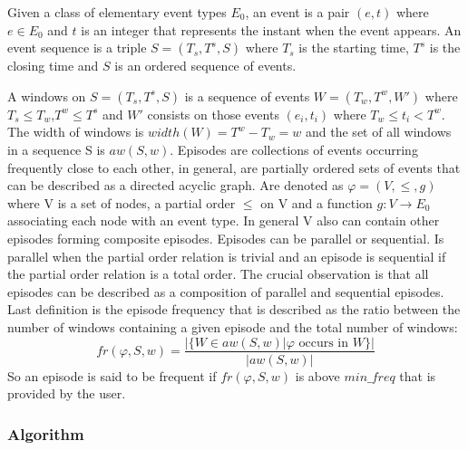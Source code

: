 Given a class of elementary event types $E_{0}$, an event is a pair $(e,t)$
where $e \in E_{0}$ and $t$ is an integer that represents the instant when
the event appears. An event sequence is a triple $S=(T_{s},T^{s},S)$ where
$T_{s}$ is the starting time, $T^{s}$ is the closing time and $S$ is an ordered
sequence of events.

A windows on $S=(T_{s},T^{s},S)$ is a sequence of events $W=(T_{w},T^{w},W')$
where $T_{s} \leq T_{w}$,$T^{w} \leq T^{s}$ and $W'$ consists on those events
$(e_{i},t_{i})$ where $T_{w} \leq t_{i} < T^{w}$. The width of windows is
$width(W)=T^{w}-T_{w}=w$ and the set of all windows in a sequence S is
$aw(S,w)$. Episodes are collections of events occurring frequently 
close to each other, in
general, are partially ordered sets of events that can be described as a
directed acyclic graph. Are denoted as $\varphi =(V,\le,g)$ where V is a set of
nodes, a partial order $\le$ on V and a function $g:V \rightarrow E_{0}$
associating each node with an event type. In general V also can contain other
episodes forming composite episodes. Episodes can be parallel or sequential.
Is parallel when the partial order relation is trivial and an episode is
sequential if the partial order relation is a total order. The crucial
observation is that all episodes can be described as a composition of parallel
and sequential episodes. Last definition is the episode frequency that 
is described as the ratio between the number of windows containing a given 
episode and the total number of windows:
$$
fr(\varphi,S,w)=\frac{|\text{\{}W \in aw(S,w) | \varphi \text{ occurs in }
W\text{\}}|}{|aw(S,w)|}
$$
So an episode is said to be frequent if $fr(\varphi,S,w)$ is above $min\text{\_}freq$
that is provided by the user.

\subsubsection{Algorithm}

